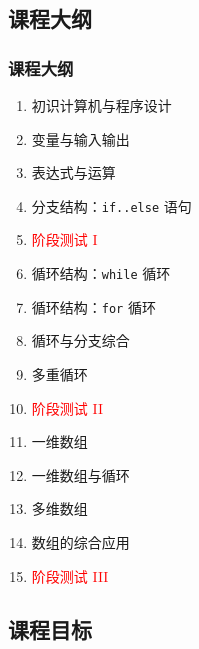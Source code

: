 \subsection{课程大纲}

\begin{frame}[fragile]
    \frametitle{课程大纲}

    \begin{multicols}{2}
        \begin{enumerate}
            \item<1-> 初识计算机与程序设计
            \item<1-> 变量与输入输出
            \item<1-> 表达式与运算
            \item<1-> 分支结构：\lstinline|if..else| 语句
            \item<1-> \textcolor{red}{阶段测试 I}
            \item<2-> 循环结构：\lstinline|while| 循环
            \item<2-> 循环结构：\lstinline|for| 循环
            \item<2-> 循环与分支综合
            \item<2-> 多重循环
            \item<2-> \textcolor{red}{阶段测试 II}
            \item<3-> 一维数组
            \item<3-> 一维数组与循环
            \item<3-> 多维数组
            \item<3-> 数组的综合应用
            \item<3-> \textcolor{red}{阶段测试 III}
        \end{enumerate}
    \end{multicols}
\end{frame}

\subsection{课程目标}

